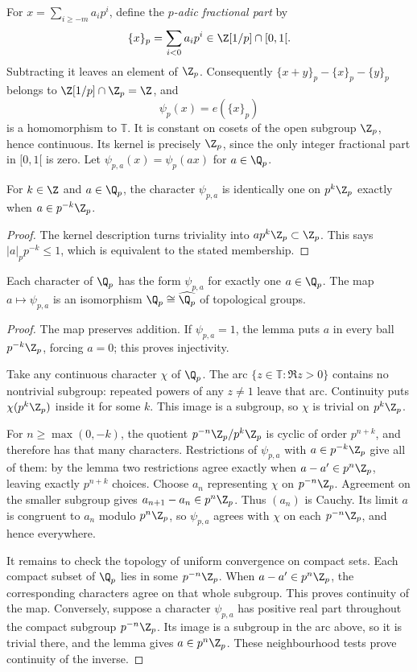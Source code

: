 For $x=\sum_{i\ge-m}a_ip^i$, define the \emph{$p$-adic fractional part} by
\[\{x\}_p=\sum_{i<0}a_ip^i\in\Z[1/p]\cap[0,1[.\]
Subtracting it leaves an element of $\Z_p$. Consequently $\{x+y\}_p-\{x\}_p-\{y\}_p$ belongs to $\Z[1/p]\cap\Z_p=\Z$, and
\[\psi_p(x)=e(\{x\}_p)\]
is a homomorphism to $\mathbb T$. It is constant on cosets of the open subgroup $\Z_p$, hence continuous. Its kernel is precisely $\Z_p$, since the only integer fractional part in $[0,1[$ is zero. Let $\psi_{p,a}(x)=\psi_p(ax)$ for $a\in\Q_p$.

\begin{lemma}\label{lem:psiperp}
For $k\in\Z$ and $a\in\Q_p$, the character $\psi_{p,a}$ is identically one on $p^k\Z_p$ exactly when $a\in p^{-k}\Z_p$.
\end{lemma}
\begin{proof}
The kernel description turns triviality into $ap^k\Z_p\subset\Z_p$. This says $|a|_pp^{-k}\le1$, which is equivalent to the stated membership.
\end{proof}

\begin{theorem}\label{thm:qpselfdual}
Each character of $\Q_p$ has the form $\psi_{p,a}$ for exactly one $a\in\Q_p$. The map $a\mapsto\psi_{p,a}$ is an isomorphism $\Q_p\cong\widehat{\Q_p}$ of topological groups.
\end{theorem}
\begin{proof}
The map preserves addition. If $\psi_{p,a}=1$, the lemma puts $a$ in every ball $p^{-k}\Z_p$, forcing $a=0$; this proves injectivity.

Take any continuous character $\chi$ of $\Q_p$. The arc $\{z\in\mathbb T:\Re z>0\}$ contains no nontrivial subgroup: repeated powers of any $z\ne1$ leave that arc. Continuity puts $\chi(p^k\Z_p)$ inside it for some $k$. This image is a subgroup, so $\chi$ is trivial on $p^k\Z_p$.

For $n\ge\max(0,-k)$, the quotient $p^{-n}\Z_p/p^k\Z_p$ is cyclic of order $p^{n+k}$, and therefore has that many characters. Restrictions of $\psi_{p,a}$ with $a\in p^{-k}\Z_p$ give all of them: by the lemma two restrictions agree exactly when $a-a'\in p^n\Z_p$, leaving exactly $p^{n+k}$ choices. Choose $a_n$ representing $\chi$ on $p^{-n}\Z_p$. Agreement on the smaller subgroup gives $a_{n+1}-a_n\in p^n\Z_p$. Thus $(a_n)$ is Cauchy. Its limit $a$ is congruent to $a_n$ modulo $p^n\Z_p$, so $\psi_{p,a}$ agrees with $\chi$ on each $p^{-n}\Z_p$, and hence everywhere.

It remains to check the topology of uniform convergence on compact sets. Each compact subset of $\Q_p$ lies in some $p^{-n}\Z_p$. When $a-a'\in p^n\Z_p$, the corresponding characters agree on that whole subgroup. This proves continuity of the map. Conversely, suppose a character $\psi_{p,a}$ has positive real part throughout the compact subgroup $p^{-n}\Z_p$. Its image is a subgroup in the arc above, so it is trivial there, and the lemma gives $a\in p^n\Z_p$. These neighbourhood tests prove continuity of the inverse.
\end{proof}

